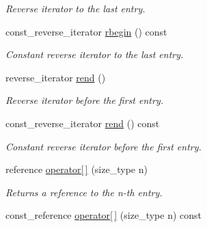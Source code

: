 \begin{DoxyCompactItemize}
\begin{DoxyCompactList}\small\item\em Reverse iterator to the last entry. \end{DoxyCompactList}\item 
\hypertarget{a00559_a8b3a43bed52bd94b9b316b0f54bf9507}{const\-\_\-reverse\-\_\-iterator \hyperlink{a00559_a8b3a43bed52bd94b9b316b0f54bf9507}{rbegin} () const }\label{a00559_a8b3a43bed52bd94b9b316b0f54bf9507}

\begin{DoxyCompactList}\small\item\em Constant reverse iterator to the last entry. \end{DoxyCompactList}\item 
\hypertarget{a00559_af1a4fa46f9ad970fb1da40b28bf78ff6}{reverse\-\_\-iterator \hyperlink{a00559_af1a4fa46f9ad970fb1da40b28bf78ff6}{rend} ()}\label{a00559_af1a4fa46f9ad970fb1da40b28bf78ff6}

\begin{DoxyCompactList}\small\item\em Reverse iterator before the first entry. \end{DoxyCompactList}\item 
\hypertarget{a00559_ae9859e5f386ba4c0cd01c5f1388e8e5f}{const\-\_\-reverse\-\_\-iterator \hyperlink{a00559_ae9859e5f386ba4c0cd01c5f1388e8e5f}{rend} () const }\label{a00559_ae9859e5f386ba4c0cd01c5f1388e8e5f}

\begin{DoxyCompactList}\small\item\em Constant reverse iterator before the first entry. \end{DoxyCompactList}\item 
\hypertarget{a00559_a57f90aea63a18af2e15740127f279b14}{reference \hyperlink{a00559_a57f90aea63a18af2e15740127f279b14}{operator\mbox{[}$\,$\mbox{]}} (size\-\_\-type n)}\label{a00559_a57f90aea63a18af2e15740127f279b14}

\begin{DoxyCompactList}\small\item\em Returns a reference to the n-\/th entry. \end{DoxyCompactList}\item 
\hypertarget{a00559_a303651d3905dd51c370cc2ee9a725f4a}{const\-\_\-reference \hyperlink{a00559_a303651d3905dd51c370cc2ee9a725f4a}{operator\mbox{[}$\,$\mbox{]}} (size\-\_\-type n) const }\label{a00559_a303651d3905dd51c370cc2ee9a725f4a}


\end{DoxyCompactItemize}
